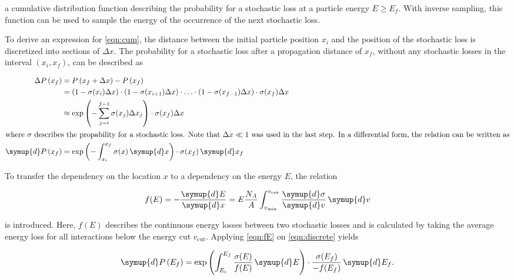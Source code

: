 a cumulative distribution function describing the probability for a stochastic loss at a particle energy $E \geq E_f$.
With inverse sampling, this function can be used to sample the energy of the occurrence of the next stochastic loss.

To derive an expression for \eqref{eqn:cum}, the distance between the initial particle position $x_i$ and the position of the stochastic loss is discretized into sections of $\Delta x$.
The probability for a stochastic loss after a propagation distance of $x_f$, without any stochastic losses in the interval $\left(x_i, x_f\right)$, can be described as

\begin{equation}
	\label{eqn:discrete}
	\begin{split}
	\Delta P\left(x_f\right) &= P\left( x_f + \Delta x \right) - P\left( x_f \right)\\
	&= \left( 1 - \sigma(x_i) \Delta x \right) \cdot \left( 1 - \sigma(x_{i+1}) \Delta x \right) \cdot\ldots\cdot \left( 1 - \sigma(x_{f-1}) \Delta x \right) \cdot \sigma(x_f) \Delta x \\
	&\approx \exp \left( - \sum_{j=i}^{f-1} \sigma(x_j) \Delta x_j \right) \cdot \sigma(x_f) \Delta x\\
	\intertext{where $\sigma$ describes the propability for a stochastic loss. Note that $\Delta x \ll 1$ was used in the last step. In a differential form, the relation can be written as}
	\symup{d}P\left( x_f \right) &= \exp\left(-\int_{x_i}^{x_f} \sigma(x) \, \symup{d}x \right) \cdot \sigma(x_f) \, \symup{d} x_f
	\end{split}
\end{equation}

To transfer the dependency on the location $x$ to a dependency on the energy $E$, the relation

\begin{equation}
	\label{eqn:fE}
	f(E) = -\frac{\symup{d}E}{\symup{d}x} = E \frac{N_A}{A} \int_{v_\text{min}}^{v_\text{cut}} \frac{\symup{d}\sigma}{\symup{d}v} \, \symup{d}v
\end{equation}

is introduced.
Here, $f(E)$ describes the continuous energy losses between two stochastic losses and is calculated by taking the average energy loss for all interactions below the energy cut $v_\text{cut}$.
Applying \eqref{eqn:fE} on \eqref{eqn:discrete} yields

\begin{equation}
	\label{eqn:discrete_energy}
	\symup{d}P\left(E_f\right) = \exp \left( \int_{E_i}^{E_f} \frac{\sigma(E)}{ f(E) } \, \symup{d}E \right) \cdot \frac{\sigma(E_f)}{-f(E_f)} \, \symup{d}E_f.
\end{equation}

